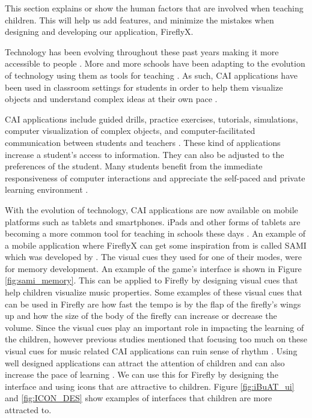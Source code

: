 This section explains or show the human factors that are involved when teaching children. This will help us add features, and minimize the mistakes when designing and developing our application, FireflyX.

Technology has been evolving throughout these past years making it more accessible to people \cite{czaja2007impact}. More and more schools have been adapting to the evolution of technology using them as tools for teaching \cite{aqda2011comparative}. As such, CAI applications have been used in classroom settings for students in order to help them visualize objects and understand complex ideas at their own pace \cite{arnold1997computer}. 

CAI applications include guided drills, practice exercises, tutorials, simulations, computer visualization of complex objects, and computer-facilitated communication between students and teachers \cite{arnold1997computer, christmann2000comparative}. These kind of applications increase a student's access to information. They can also be adjusted to the preferences of the student. Many students benefit from the immediate responsiveness of
computer interactions and appreciate the self-paced and private
learning environment \cite{arnold1997computer}.

With the evolution of technology, CAI applications are now available on mobile platforms such as tablets and smartphones. iPads and other forms of tablets are becoming a more common tool for teaching in schools these days \cite{papadakis2017mobile}. An example of a mobile application where FireflyX can get some inspiration from is called SAMI which was developed by . The visual cues they used for one of their modes, were for memory development. An example of the game's interface is shown in Figure \ref{fig:sami_memory}. This can be applied to Firefly by designing visual cues that help children visualize music properties. Some examples of these visual cues that can be used in Firefly are how fast the tempo is by the flap of the firefly's wings up and how the size of the body of the firefly can increase or decrease the volume. Since the visual cues play an important role in impacting the learning of the children, however previous studies mentioned that focusing too much on these visual cues for music related CAI applications can ruin sense of rhythm  \cite{pennycook1985computer, chung2017designing}. Using well designed applications can attract the attention of children \cite{chung2017designing} and can also increase the pace of learning \cite{cohen2011young}. We can use this for Firefly by designing the interface and using icons that are attractive to children. Figure \ref{fig:iBuAT_ui} and \ref{fig:ICON_DES} show examples of interfaces that children are more attracted to.

